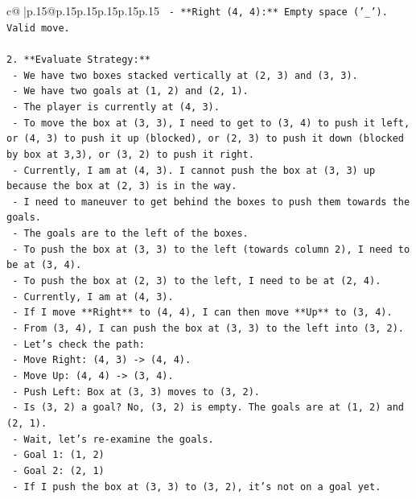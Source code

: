 \documentclass{article}
\begin{document}
{\begin{supertabular}{c@{$\;$}|p{.15\linewidth}@{}p{.15\linewidth}p{.15\linewidth}p{.15\linewidth}p{.15\linewidth}p{.15\linewidth}}
{{{\texttt{    {-} **Right (4, 4):** Empty space ('\_'). Valid move.} \\
\\ 
\texttt{2.  **Evaluate Strategy:**} \\
\texttt{    {-} We have two boxes stacked vertically at (2, 3) and (3, 3).} \\
\texttt{    {-} We have two goals at (1, 2) and (2, 1).} \\
\texttt{    {-} The player is currently at (4, 3).} \\
\texttt{    {-} To move the box at (3, 3), I need to get to (3, 4) to push it left, or (4, 3) to push it up (blocked), or (2, 3) to push it down (blocked by box at 3,3), or (3, 2) to push it right.} \\
\texttt{    {-} Currently, I am at (4, 3). I cannot push the box at (3, 3) up because the box at (2, 3) is in the way.} \\
\texttt{    {-} I need to maneuver to get behind the boxes to push them towards the goals.} \\
\texttt{    {-} The goals are to the left of the boxes.} \\
\texttt{    {-} To push the box at (3, 3) to the left (towards column 2), I need to be at (3, 4).} \\
\texttt{    {-} To push the box at (2, 3) to the left, I need to be at (2, 4).} \\
\texttt{    {-} Currently, I am at (4, 3).} \\
\texttt{    {-} If I move **Right** to (4, 4), I can then move **Up** to (3, 4).} \\
\texttt{    {-} From (3, 4), I can push the box at (3, 3) to the left into (3, 2).} \\
\texttt{    {-} Let's check the path:} \\
\texttt{        {-} Move Right: (4, 3) {-}> (4, 4).} \\
\texttt{        {-} Move Up: (4, 4) {-}> (3, 4).} \\
\texttt{        {-} Push Left: Box at (3, 3) moves to (3, 2).} \\
\texttt{    {-} Is (3, 2) a goal? No, (3, 2) is empty. The goals are at (1, 2) and (2, 1).} \\
\texttt{    {-} Wait, let's re{-}examine the goals.} \\
\texttt{        {-} Goal 1: (1, 2)} \\
\texttt{        {-} Goal 2: (2, 1)} \\
\texttt{    {-} If I push the box at (3, 3) to (3, 2), it's not on a goal yet.} \\
}}}
\end{supertabular}}
\end{document}
